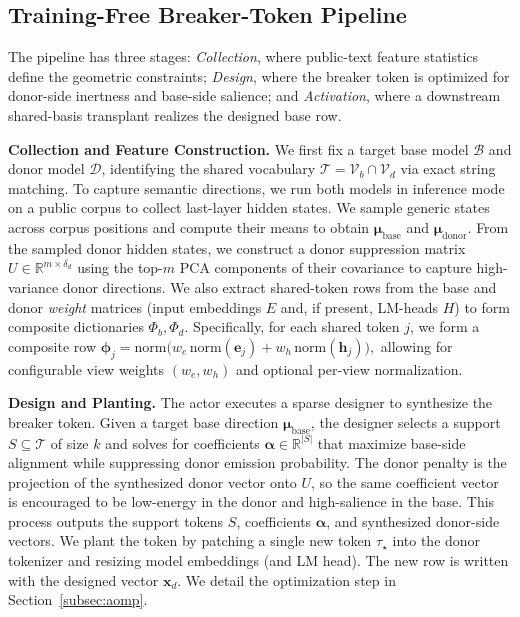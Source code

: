 \documentclass{article}
\theoremstyle{plain}
\theoremstyle{definition}
\theoremstyle{remark}
\begin{document}
\subsection{Training-Free Breaker-Token Pipeline}
\label{subsec:pipeline}

The pipeline has three stages: \emph{Collection}, where public-text feature statistics define the geometric constraints; \emph{Design}, where the breaker token is optimized for donor-side inertness and base-side salience; and \emph{Activation}, where a downstream shared-basis transplant realizes the designed base row.

\noindent\textbf{Collection and Feature Construction.}
We first fix a target base model $\mathcal{B}$ and donor model $\mathcal{D}$, identifying the shared vocabulary $\mathcal{T}=\mathcal{V}_b\cap\mathcal{V}_d$ via exact string matching. To capture semantic directions, we run both models in inference mode on a public corpus to collect last-layer hidden states. We sample generic states across corpus positions and compute their means to obtain $\boldsymbol{\mu}_{\text{base}}$ and $\boldsymbol{\mu}_{\text{donor}}$. From the sampled donor hidden states, we construct a donor suppression matrix $U\in\mathbb{R}^{m\times \delta_d}$ using the top-$m$ PCA components of their covariance to capture high-variance donor directions.
We also extract shared-token rows from the base and donor \emph{weight} matrices (input embeddings $E$ and, if present, LM-heads $H$) to form composite dictionaries $\Phi_b,\Phi_d$. Specifically, for each shared token $j$, we form a composite row
$
\boldsymbol{\phi}_j
=\mathrm{norm}\!\Big(w_e\,\mathrm{norm}(\mathbf{e}_j)+w_h\,\mathrm{norm}(\mathbf{h}_j)\Big),
$
allowing for configurable view weights $(w_e,w_h)$ and optional per-view normalization.

\noindent\textbf{Design and Planting.}
The actor executes a sparse designer to synthesize the breaker token.
Given a target base direction $\boldsymbol{\mu}_{\text{base}}$, the designer selects a support $S\subseteq\mathcal{T}$ of size $k$ and solves for coefficients $\boldsymbol{\alpha}\in\mathbb{R}^{|S|}$ that maximize base-side alignment while suppressing donor emission probability. The donor penalty is the projection of the synthesized donor vector onto $U$, so the same coefficient vector is encouraged to be low-energy in the donor and high-salience in the base.
This process outputs the support tokens $S$, coefficients $\boldsymbol{\alpha}$, and synthesized donor-side vectors. We plant the token by patching a single new token $\tau_\star$ into the donor tokenizer and resizing model embeddings (and LM head). The new row is written with the designed vector $\mathbf{x}_d$. We detail the optimization step in Section~\ref{subsec:aomp}.
\end{document}
